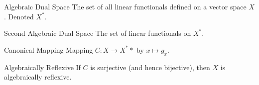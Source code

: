 \documentclass[avery5388,grid,frame]{flashcards}
\begin{document}
\begin{flashcard}[Definition]{Algebraic Dual Space}
The set of all linear functionals defined on a vector space $X$.
Denoted $X^*$.
\end{flashcard}

\begin{flashcard}[Definition]{Second Algebraic Dual Space}
The set of linear functionals on $X^*$.
\end{flashcard}

\begin{flashcard}[Definition]{Canonical Mapping}
Mapping $C\colon X\rightarrow X^**$ by $x\mapsto g_x$.
\end{flashcard}

\begin{flashcard}[Definition]{Algebraically Reflexive}
If $C$ is surjective (and hence bijective), then $X$ is algebraically reflexive.
\end{flashcard}
\end{document}
